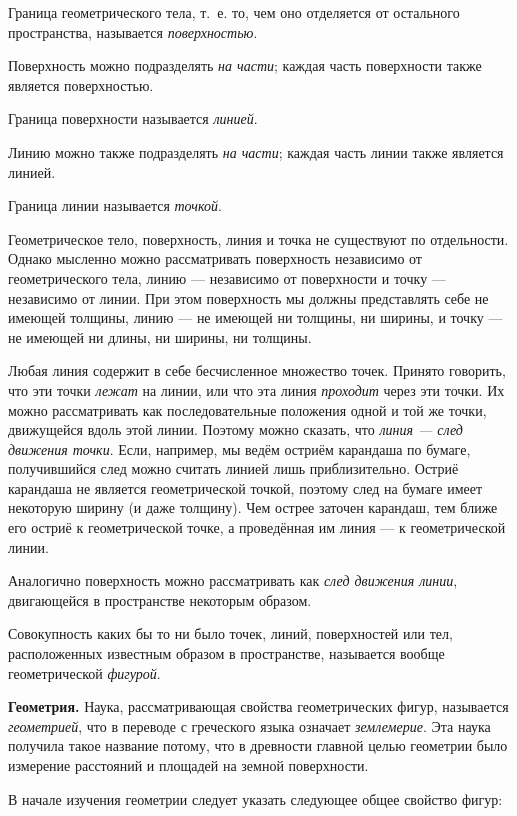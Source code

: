 Граница геометрического тела, т.~е. то, чем оно отделяется от остального пространства, называется \emph{поверхностью}.

Поверхность можно подразделять \emph{на части}; каждая часть поверхности также является поверхностью.

Граница поверхности называется \emph{линией}.

Линию можно также подразделять \emph{на части}; каждая часть линии также является линией.

Граница линии называется \emph{точкой}.

Геометрическое тело, поверхность, линия и точка не существуют по отдельности. Однако мысленно можно рассматривать поверхность независимо от геометрического тела, линию --- независимо от поверхности и точку --- независимо от линии. При этом поверхность мы должны представлять себе не имеющей толщины, линию --- не имеющей ни толщины, ни ширины, и точку --- не имеющей ни длины, ни ширины, ни толщины.

Любая линия содержит в себе бесчисленное множество точек. Принято говорить, что эти точки \emph{лежат} на линии, или что эта линия \emph{проходит} через эти точки. Их можно рассматривать как последовательные положения одной и той же точки, движущейся вдоль этой линии. Поэтому можно сказать, что \emph{линия --- след движения точки}. Если, например, мы ведём остриём карандаша по бумаге, получившийся след можно считать линией лишь приблизительно. Остриё карандаша не является геометрической точкой, поэтому след на бумаге имеет некоторую ширину (и даже толщину). Чем острее заточен карандаш, тем ближе его остриё к геометрической точке, а проведённая им линия --- к геометрической линии.

Аналогично поверхность можно рассматривать как \emph{след движения линии}, двигающейся в пространстве некоторым образом.

Совокупность каких бы то ни было точек, линий, поверхностей или тел, расположенных известным образом в пространстве, называется вообще геометрической \emph{фигурой}.

 \textbf{Геометрия.} Наука, рассматривающая свойства геометрических фигур, называется \emph{геометрией}, что в переводе с
греческого языка означает \emph{землемерие}. Эта наука получила такое название потому, что в древности главной целью геометрии было измерение расстояний и площадей на земной поверхности.

 В начале изучения геометрии следует указать следующее общее свойство фигур:

